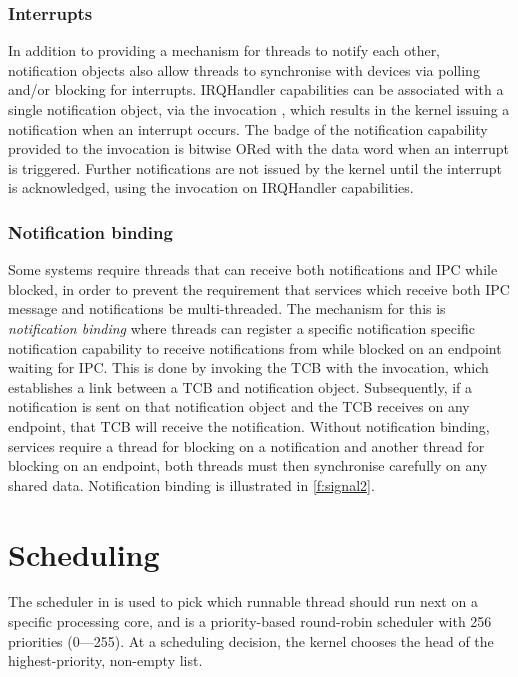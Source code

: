 \subsubsection{Interrupts}

In addition to providing a mechanism for threads to notify each other, notification objects 
also allow threads to synchronise with devices via polling and/or blocking for interrupts. 
IRQHandler capabilities can be associated with a single notification object, via the invocation
, which results in the kernel issuing a notification when an interrupt
occurs. The badge of the notification capability provided to the invocation is bitwise ORed with the
data word when an interrupt is triggered. Further notifications are not issued by the kernel
until the interrupt is acknowledged, using the  invocation on IRQHandler
capabilities.

\subsubsection{Notification binding}
\label{s:notification-binding}

Some systems require threads that can receive both notifications and IPC while blocked, in order to
prevent the requirement that services which receive both IPC message and notifications be multi-threaded.
The
mechanism for this is \emph{notification binding} where threads can register a specific notification
specific notification capability to receive notifications from while blocked on
an endpoint waiting for IPC. This is done by invoking the TCB
with the  invocation, which establishes a link between a TCB and
notification object. Subsequently, if a notification is sent on that notification object and the TCB receives
on any endpoint, that TCB will receive the notification. 
Without notification binding, services require a thread for blocking on a notification and another
thread for blocking on an endpoint, both threads must then synchronise carefully on any shared data.
Notification binding is illustrated in
\cref{f:signal2}.


\section{Scheduling}

The scheduler in \selfour is used to pick which runnable thread should run next on a specific
processing core, and is a priority-based round-robin scheduler with 256 priorities (0---255). 
At a scheduling decision, the kernel chooses the head of the highest-priority, non-empty list.

